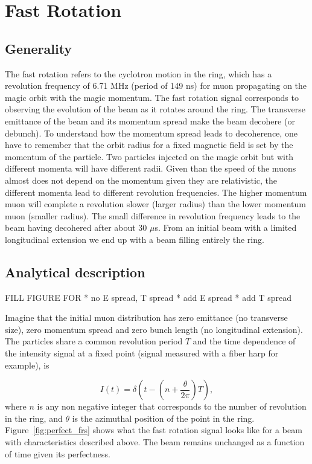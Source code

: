 \section{Fast Rotation}


\subsection{Generality}

The fast rotation refers to the cyclotron motion in the ring, which has a revolution frequency of 6.71 MHz (period of 149 ns) 
for muon propagating on the magic orbit with the magic momentum. 
The fast rotation signal corresponds to observing the evolution of the beam as it rotates around the ring. 
The transverse emittance of the beam and its momentum spread make the beam decohere (or debunch).
To understand how the momentum spread leads to decoherence, one have to remember that the orbit radius for a fixed magnetic
field is set by the momentum of the particle. Two particles injected on the magic orbit but with different momenta will
have different radii. Given than the speed of the muons almost does not depend on the momentum given they are relativistic,
the different momenta lead to different revolution frequencies. The higher momentum muon will complete a revolution
slower (larger radius) than the lower momentum muon (smaller radius). 
The small difference in revolution frequency leads to the beam having decohered after about 30 $\mu$s. 
From an initial beam with a limited longitudinal extension we end up with a beam filling entirely the ring.

\subsection{Analytical description}

FILL FIGURE FOR\newline
  * no  E spread, T spread\newline
  * add E spread\newline
  * add T spread\newline

Imagine that the initial muon distribution has zero emittance (no transverse size), zero momentum spread and zero bunch length (no longitudinal extension). 
The particles share a common revolution period $T$ and the time dependence of the intensity signal at a fixed point (signal measured with a fiber harp for example), is 

\begin{equation}
I(t)=\delta\left(t-\left(n+\frac{\theta}{2\pi}\right)T\right),
\end{equation} 
where $n$ is any non negative integer that corresponds to the number of revolution in the ring, 
and $\theta$ is the azimuthal position of the point in the ring.
Figure~\ref{fig:perfect_frs} shows what the fast rotation signal looks like for a beam with characteristics described above.
The beam remains unchanged as a function of time given its perfectness.

